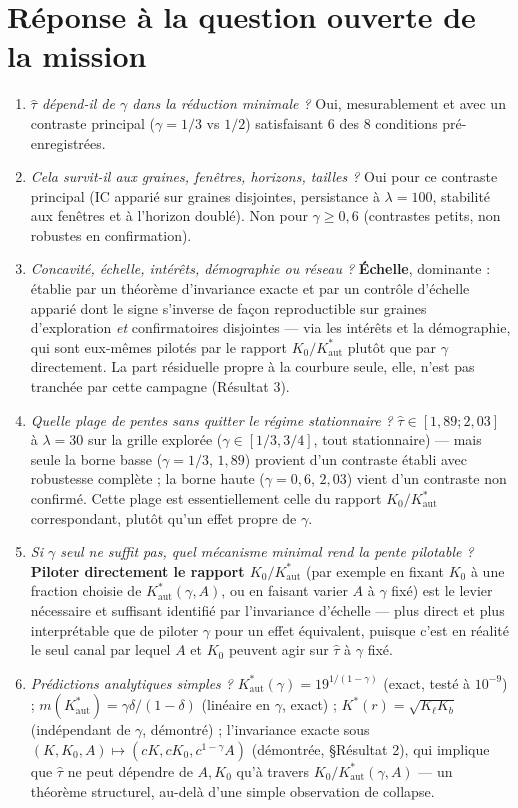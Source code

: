 \documentclass[11pt,a4paper]{article}
\newcommand{\Kaut}{K^{*}_{\mathrm{aut}}}
\begin{document}
\section{Réponse à la question ouverte de la mission}

\begin{enumerate}
\item \emph{$\hat\tau$ dépend-il de $\gamma$ dans la réduction
minimale ?} Oui, mesurablement et avec un contraste principal
($\gamma=1/3$ vs $1/2$) satisfaisant 6 des 8 conditions pré-enregistrées.
\item \emph{Cela survit-il aux graines, fenêtres, horizons, tailles ?}
Oui pour ce contraste principal (IC apparié sur graines disjointes,
persistance à $\lambda=100$, stabilité aux fenêtres et à l'horizon
doublé). Non pour $\gamma\ge0{,}6$ (contrastes petits, non robustes en
confirmation).
\item \emph{Concavité, échelle, intérêts, démographie ou réseau ?}
\textbf{Échelle}, dominante : établie par un théorème d'invariance exacte
et par un contrôle d'échelle apparié dont le signe s'inverse de façon
reproductible sur graines d'exploration \emph{et} confirmatoires
disjointes --- via les intérêts et la démographie, qui sont eux-mêmes
pilotés par le rapport $K_0/\Kaut$ plutôt que par $\gamma$ directement.
La part résiduelle propre à la courbure seule, elle, n'est pas tranchée
par cette campagne (Résultat 3).
\item \emph{Quelle plage de pentes sans quitter le régime
stationnaire ?} $\hat\tau\in[1{,}89;2{,}03]$ à $\lambda=30$ sur la
grille explorée ($\gamma\in[1/3,3/4]$, tout stationnaire) --- mais seule
la borne basse ($\gamma=1/3$, $1{,}89$) provient d'un contraste établi
avec robustesse complète ; la borne haute ($\gamma=0{,}6$, $2{,}03$)
vient d'un contraste non confirmé. Cette plage est essentiellement celle
du rapport $K_0/\Kaut$ correspondant, plutôt qu'un effet propre de
$\gamma$.
\item \emph{Si $\gamma$ seul ne suffit pas, quel mécanisme minimal
rend la pente pilotable ?} \textbf{Piloter directement le rapport
$K_0/\Kaut$} (par exemple en fixant $K_0$ à une fraction choisie de
$\Kaut(\gamma,A)$, ou en faisant varier $A$ à $\gamma$ fixé) est le
levier nécessaire et suffisant identifié par l'invariance d'échelle ---
plus direct et plus interprétable que de piloter $\gamma$ pour un effet
équivalent, puisque c'est en réalité le seul canal par lequel $A$ et
$K_0$ peuvent agir sur $\hat\tau$ à $\gamma$ fixé.
\item \emph{Prédictions analytiques simples ?} $\Kaut(\gamma)=19^{1/(1-\gamma)}$
(exact, testé à $10^{-9}$) ; $m(\Kaut)=\gamma\delta/(1-\delta)$ (linéaire
en $\gamma$, exact) ; $K^*(r)=\sqrt{K_\ell K_b}$ (indépendant de $\gamma$,
démontré) ; l'invariance exacte sous $(K,K_0,A)\mapsto(cK,cK_0,c^{1-\gamma}A)$
(démontrée, §Résultat 2), qui implique que $\hat\tau$ ne peut dépendre de
$A,K_0$ qu'à travers $K_0/\Kaut(\gamma,A)$ --- un théorème structurel,
au-delà d'une simple observation de collapse.
\end{enumerate}


\end{document}
